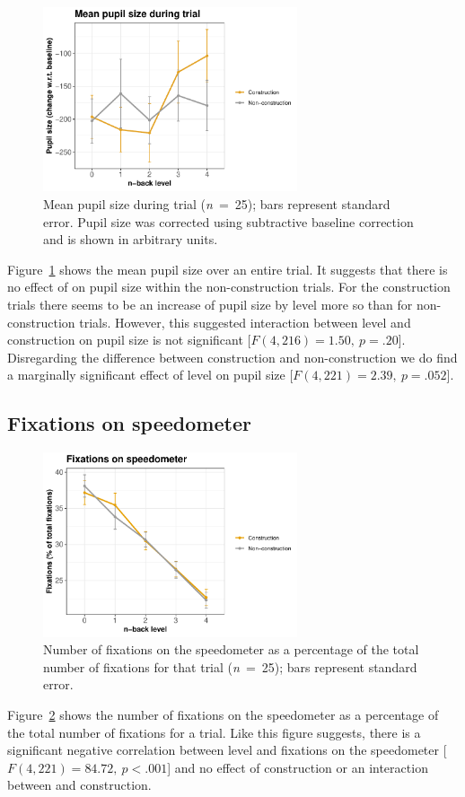 \begin{figure}
  \centering
  \includegraphics[width=7.5cm]{images/pupil_size_interaction.pdf}
  \caption{Mean pupil size during trial (\textit{n}\ =\ 25); bars represent standard error.
  Pupil size was corrected using subtractive baseline correction and is shown in arbitrary units.}
  \label{fig:mean-ps}
\end{figure}

Figure~\ref{fig:mean-ps} shows the mean pupil size over an entire trial. 
It suggests that there is no effect of \nback on pupil size within the non-construction trials.
For the construction trials there seems to be an increase of pupil size by \nback level more so than for non-construction trials.
However, this suggested interaction between \nback level and construction on pupil size is not significant [\(F(4,216)=1.50,\ p=.20\)].
Disregarding the difference between construction and non-construction we do find a marginally significant effect of \nback level on pupil size [\(F(4,221)=2.39,\ p=.052\)].

\subsection{Fixations on speedometer}

\begin{figure}
  \centering
  \includegraphics[width=7.5cm]{images/speedometer_interaction.pdf}
  \caption{Number of fixations on the speedometer as a percentage of the total number of fixations for that trial (\textit{n}\ =\ 25); bars represent standard error.}
  \label{fig:fix-speedometer}
\end{figure}

Figure~\ref{fig:fix-speedometer} shows the number of fixations on the speedometer as a percentage of the total number of fixations for a trial.
Like this figure suggests, there is a significant negative correlation between \nback level and fixations on the speedometer [\(F(4,221)=84.72,\ p<.001\)] and no effect of construction or an interaction between \nback and construction. 